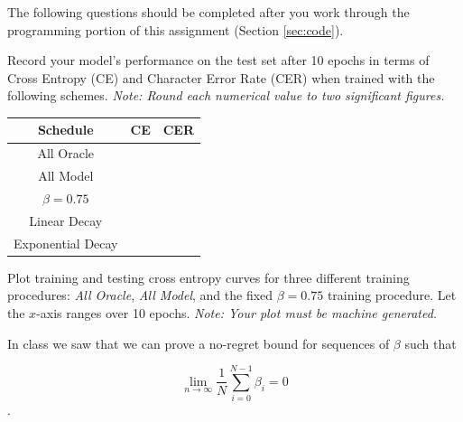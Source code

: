\documentclass[11pt,addpoints,answers]{exam}
\numberwithin{equation}{section} %
\numberwithin{figure}{section} %
\numberwithin{table}{section} %
\begin{document}
The following questions should be completed after you work through the programming portion of this assignment (Section \ref{sec:code}). 

\begin{questions}

\question[10] Record your model's performance on the test set after 10 epochs in terms of Cross Entropy (CE) and Character Error Rate (CER) when trained with the following schemes. \emph{Note: Round each numerical value to two significant figures.}


\bgroup
\def\arraystretch{1.5}
\begin{center}
\begin{tabular}{ |c|p{1cm}|p{1cm}| } 
 \hline
 \textbf{Schedule} & \textbf{CE} & \textbf{CER} \\
 \hline
 All Oracle &  & \\ 
 \hline
 All Model &  &  \\ 
 \hline
 $\beta = 0.75$ & &  \\ 
 \hline
 Linear Decay &  &  \\ 
 \hline
 Exponential Decay &  &  \\ 
 \hline
\end{tabular}
\end{center}
\egroup


\question[10] Plot training and testing cross entropy curves for three different training procedures: \emph{All Oracle}, \textit{All Model}, and the fixed $\beta = 0.75$ training procedure. Let the $x$-axis ranges over 10 epochs. \emph{Note: Your plot must be machine generated.}

\begin{tcolorbox}[fit,height=12cm, width=15cm, blank, borderline={1pt}{-2pt}]
\end{tcolorbox}

\clearpage
\question In class we saw that we can prove a no-regret bound for sequences of $\beta$ such that

$$\lim_{n\to \infty} \frac{1}{N}\sum_{i=0}^{N-1} \beta_i = 0$$. 

\end{questions}
\end{document}
